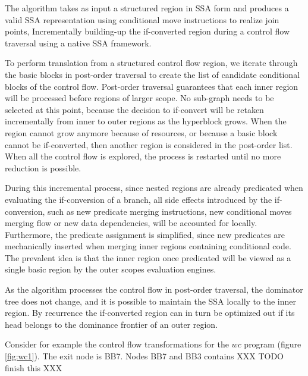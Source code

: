 The algorithm takes as input a structured region in SSA form and produces a valid SSA representation using conditional move instructions to realize join points, Incrementally building-up the if-converted region during a control flow traversal using a native SSA framework.

To perform translation from a structured control flow region, we iterate through the basic blocks in post-order traversal to create the list of candidate conditional blocks of the control flow. Post-order traversal guarantees that each inner region will be processed before regions of larger scope. No sub-graph needs to be selected at this point, because the decision to if-convert will be retaken incrementally from inner to outer regions as the hyperblock grows. When the region cannot grow anymore because of resources, or because a basic block cannot be if-converted, then another region is considered in the post-order list. When all the control flow is explored, the process is restarted until no more reduction is possible.

During this incremental process, since nested regions are already predicated when evaluating the if-conversion of a branch, all side effects introduced by the if-conversion, such as new predicate merging instructions, new conditional moves merging flow or new data dependencies, will be accounted for locally. Furthermore, the predicate assignment is simplified, since new predicates are mechanically inserted when merging inner regions containing conditional code. The prevalent idea is that the inner region once predicated will be viewed as a single basic region by the outer scopes evaluation engines.

As the algorithm processes the control flow in post-order traversal, the dominator tree does not change, and it is possible to maintain the SSA locally to the inner region. By recurrence the if-converted region can in turn be optimized out if its head belongs to the dominance frontier of an outer region.

Consider for example the control flow transformations for the $wc$ program (figure \ref{fig:wc1}). The exit node is BB7. Nodes BB7 and BB3 contains XXX TODO finish this XXX


